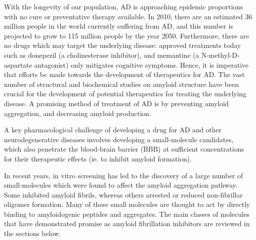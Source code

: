 

With the longevity of our population, AD is approaching epidemic proportions with no cure or preventative therapy available.\cite{Blennow:2006wd} In 2010, there are an estimated 36 million people in the world currently suffering from AD, and this number is projected to grow to 115 million people by the year 2050.\cite{alzreport:2012}  Furthermore, there are no drugs which may target the underlying disease: approved treatments today such as donepezil (a cholinesterase inhibitor), and memantine (a N-methyl-D-aspartate antagonist) only mitigates cognitive symptoms. Hence, it is imperative that efforts be made towards the development of therapeutics for AD.  The vast number of structural and biochemical studies on amyloid structure have been crucial for the development of potential therapeutics for treating the underlying disease.  A promising method of treatment of AD is by preventing amyloid aggregation, and decreasing amyloid production.


A key pharmacological challenge of developing a drug for AD and other neurodegenerative diseases involves developing a small-molecule candidates, which also penetrate the blood-brain barrier (BBB) at sufficient concentrations for their therapeutic effects (ie. to inhibit amyloid formation). %

In recent years, in vitro screening has led to the discovery of a large number of small-molecules which were found to affect the amyloid aggregation pathway. Some inhibited amyloid fibrils, whereas others arrested or reduced non-fibrillar oligomer formation. Many of these small molecules are thought to act by directly binding to amyloidogenic peptides and aggregates. The main classes of molecules that have demonstrated promise as amyloid fibrillation inhibitors are reviewed in the sections below.


